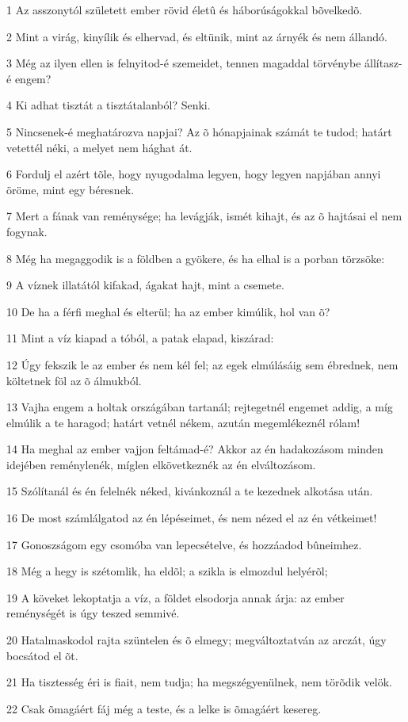 \par 1 Az asszonytól született ember rövid életû és háborúságokkal  bõvelkedõ.
\par 2 Mint a virág, kinyílik és elhervad, és eltünik, mint az árnyék és nem állandó.
\par 3 Még az ilyen ellen is felnyitod-é szemeidet, tennen magaddal törvénybe állítasz-é engem?
\par 4 Ki adhat tisztát a tisztátalanból? Senki.
\par 5 Nincsenek-é meghatározva napjai? Az õ hónapjainak számát te tudod; határt vetettél néki, a melyet nem hághat át.
\par 6 Fordulj el azért tõle, hogy nyugodalma legyen, hogy legyen napjában annyi öröme, mint egy béresnek.
\par 7 Mert a fának van reménysége; ha levágják, ismét kihajt, és az õ hajtásai el nem fogynak.
\par 8 Még ha megaggodik is a földben a gyökere, és ha elhal is a porban törzsöke:
\par 9 A víznek illatától kifakad, ágakat hajt, mint a csemete.
\par 10 De ha a férfi meghal és elterül; ha az ember kimúlik, hol van õ?
\par 11 Mint a víz kiapad a tóból, a patak elapad, kiszárad:
\par 12 Úgy fekszik le az ember és nem kél fel; az egek elmúlásáig sem ébrednek, nem költetnek föl az õ álmukból.
\par 13 Vajha engem a holtak országában tartanál; rejtegetnél engemet addig, a míg elmúlik a te haragod; határt vetnél nékem, azután megemlékeznél rólam!
\par 14 Ha meghal az ember vajjon feltámad-é? Akkor az én hadakozásom minden idejében reménylenék, míglen elkövetkeznék az én elváltozásom.
\par 15 Szólítanál és én felelnék néked, kivánkoznál a te kezednek alkotása után.
\par 16 De most számlálgatod az én lépéseimet, és nem nézed el az én vétkeimet!
\par 17 Gonoszságom egy csomóba van lepecsételve, és hozzáadod bûneimhez.
\par 18 Még a hegy is szétomlik, ha eldõl; a szikla is elmozdul helyérõl;
\par 19 A köveket lekoptatja a víz, a földet elsodorja annak árja: az ember reménységét is úgy teszed semmivé.
\par 20 Hatalmaskodol rajta szüntelen és õ elmegy; megváltoztatván az arczát, úgy bocsátod el õt.
\par 21 Ha tisztesség éri is fiait, nem tudja; ha megszégyenülnek, nem törõdik velök.
\par 22 Csak õmagáért fáj még a teste, és a lelke is õmagáért kesereg.


